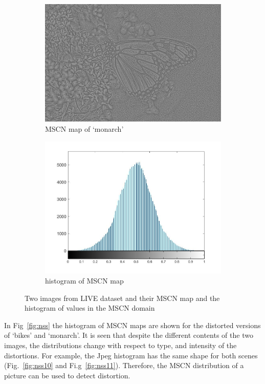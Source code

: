 \begin{figure}
\begin{subfigure}[b]{0.3\textwidth}
         \centering
         \includegraphics[width=\textwidth]{./figs/mscn_monarch}
         \caption{MSCN map of `monarch'}
         \label{fig:mscnhst_mscn_monarch}
     \end{subfigure}
     \hfill
     \begin{subfigure}[b]{0.3\textwidth}
         \centering
         \includegraphics[width=\textwidth]{./figs/mscn_histmonarch}
         \caption{histogram of MSCN map}
         \label{fig:mscnhst_hst_monarch}
     \end{subfigure}
        \caption{Two images from LIVE dataset and their MSCN map and the histogram of values in the MSCN domain}
        \label{fig:mscnhst}
\end{figure}
In Fig~\ref{fig:nss} the histogram of MSCN maps are shown for the distorted versions of `bikes' and `monarch'. It is seen that despite the different contents of the two images, the distributions change with respect to type, and intensity of the distortions. For example, the Jpeg histogram has the same shape for both scenes (Fig.~\ref{fig:nss10} and Fi.g~\ref{fig:nss11}). Therefore, the MSCN distribution of a picture can be used to detect distortion.
